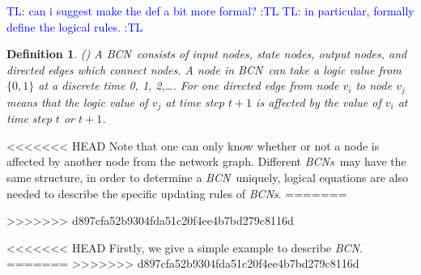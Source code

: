 \documentclass[conference]{IEEEtran} %
\newtheorem{definition}{Definition}
\def \BCN {{\em BCN}}
\def \BCNs {{\em BCNs}}
\newcommand{\tl}[1]{\textcolor{blue} {TL: #1 :TL} }
\begin{document}
\tl{can i suggest make the def a bit more formal?}
\tl{in particular, formally define the logical rules.}
\begin{definition}
(\cite{Ideker2001A}) A \BCN\ consists of input nodes, state nodes, output nodes, and directed edges which connect nodes. A node in \BCN\ can take a logic value from $\{0,1\}$ at a discrete time 0, 1, 2,\ldots. For one directed edge from node $v_i$ to node $v_j$ means that the logic value of $v_j$ at time step $t+1$ is affected by the value of $v_i$ at time step $t$ or $t+1$. 
\end{definition}


<<<<<<< HEAD
Note that one can only know whether or not a node is affected by another node from the network graph. Different \BCNs\ may have the same structure, in order to determine a \BCN\ uniquely, logical equations are also needed to describe the specific updating rules of {\em BCNs}.
=======

>>>>>>> d897cfa52b9304fda51c20f4ee4b7bd279c8116d


<<<<<<< HEAD
Firstly, we give a simple example to describe {\em BCN}.
=======
>>>>>>> d897cfa52b9304fda51c20f4ee4b7bd279c8116d
\end{document}
